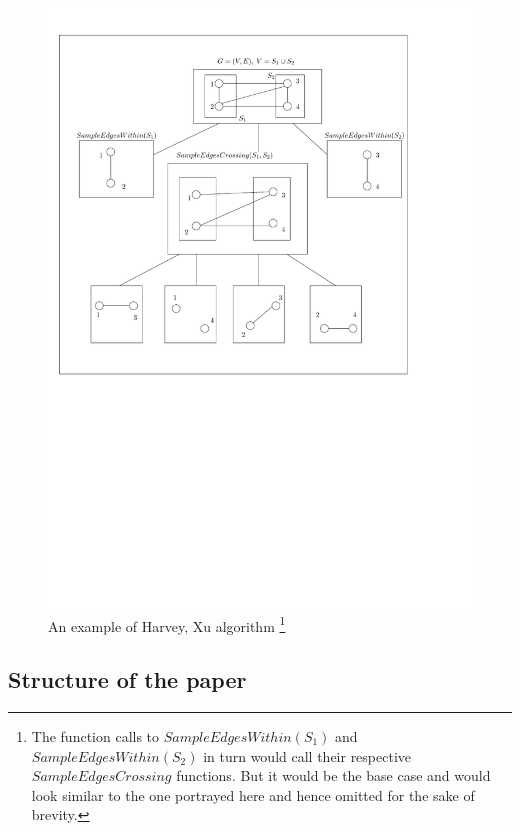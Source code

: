 \begin{figure}[h!]
\begin{minipage}{\textwidth}
\begin{center}
    \includegraphics[scale=0.85]{Figures/alg-tree}
    \caption[Example]{An example of Harvey, Xu algorithm \footnote{The function calls to $SampleEdgesWithin(S_1)$ and $SampleEdgesWithin(S_2)$ in turn would call their respective $SampleEdgesCrossing$ functions. But it would be the base case and would look similar to the one portrayed here and hence omitted for the sake of brevity.}}
\end{center}
\end{minipage}

\end{figure}
\pagebreak

\subsection{Structure of the paper}

